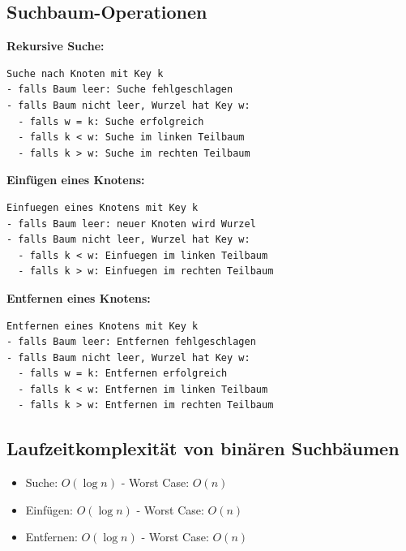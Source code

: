 \documentclass{scrreprt}
\begin{document}
\subsection{Suchbaum-Operationen}
\textbf{Rekursive Suche:}
\begin{lstlisting}
Suche nach Knoten mit Key k
- falls Baum leer: Suche fehlgeschlagen
- falls Baum nicht leer, Wurzel hat Key w:
  - falls w = k: Suche erfolgreich
  - falls k < w: Suche im linken Teilbaum
  - falls k > w: Suche im rechten Teilbaum
\end{lstlisting}
\textbf{Einfügen eines Knotens:}
\begin{lstlisting}
Einfuegen eines Knotens mit Key k
- falls Baum leer: neuer Knoten wird Wurzel
- falls Baum nicht leer, Wurzel hat Key w:
  - falls k < w: Einfuegen im linken Teilbaum
  - falls k > w: Einfuegen im rechten Teilbaum
\end{lstlisting}
\textbf{Entfernen eines Knotens:}
\begin{lstlisting}
Entfernen eines Knotens mit Key k
- falls Baum leer: Entfernen fehlgeschlagen
- falls Baum nicht leer, Wurzel hat Key w:
  - falls w = k: Entfernen erfolgreich
  - falls k < w: Entfernen im linken Teilbaum
  - falls k > w: Entfernen im rechten Teilbaum
\end{lstlisting}
\subsection{Laufzeitkomplexität von binären Suchbäumen}
\begin{itemize}
  \item Suche: $O(\log n)$ - Worst Case: $O(n)$
  \item Einfügen: $O(\log n)$ - Worst Case: $O(n)$
  \item Entfernen: $O(\log n)$ - Worst Case: $O(n)$
\end{itemize}
\end{document}
